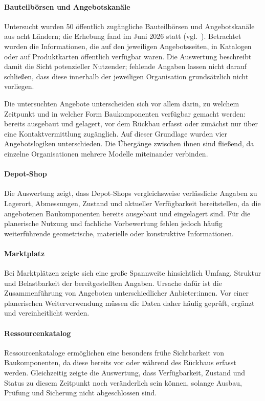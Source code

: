 \documentclass[type=zwischenbericht]{zukunftbau}
\begin{document}
\begin{SemioNest}
\paragraph{Bauteilbörsen und Angebotskanäle}
Untersucht wurden 50 öffentlich zugängliche Bauteilbörsen und Angebotskanäle aus acht Ländern; die Erhebung fand im Juni 2026 statt (vgl.\ ). Betrachtet wurden die Informationen, die auf den jeweiligen Angebotsseiten, in Katalogen oder auf Produktkarten öffentlich verfügbar waren. Die Auswertung beschreibt damit die Sicht potenzieller Nutzender; fehlende Angaben lassen nicht darauf schließen, dass diese innerhalb der jeweiligen Organisation grundsätzlich nicht vorliegen.

Die untersuchten Angebote unterscheiden sich vor allem darin, zu welchem Zeitpunkt und in welcher Form Baukomponenten verfügbar gemacht werden: bereits ausgebaut und gelagert, vor dem Rückbau erfasst oder zunächst nur über eine Kontaktvermittlung zugänglich. Auf dieser Grundlage wurden vier Angebotslogiken unterschieden. Die Übergänge zwischen ihnen sind fließend, da einzelne Organisationen mehrere Modelle miteinander verbinden.

\begin{SemioNest}
\paragraph{Depot-Shop}
Die Auswertung zeigt, dass Depot-Shops vergleichsweise verlässliche Angaben zu Lagerort, Abmessungen, Zustand und aktueller Verfügbarkeit bereitstellen, da die angebotenen Baukomponenten bereits ausgebaut und eingelagert sind. Für die planerische Nutzung und fachliche Vorbewertung fehlen jedoch häufig weiterführende geometrische, materielle oder konstruktive Informationen.

\paragraph{Marktplatz}
Bei Marktplätzen zeigte sich eine große Spannweite hinsichtlich Umfang, Struktur und Belastbarkeit der bereitgestellten Angaben. Ursache dafür ist die Zusammenführung von Angeboten unterschiedlicher Anbieter:innen. Vor einer planerischen Weiterverwendung müssen die Daten daher häufig geprüft, ergänzt und vereinheitlicht werden.

\paragraph{Ressourcenkatalog}
Ressourcenkataloge ermöglichen eine besonders frühe Sichtbarkeit von Baukomponenten, da diese bereits vor oder während des Rückbaus erfasst werden. Gleichzeitig zeigte die Auswertung, dass Verfügbarkeit, Zustand und Status zu diesem Zeitpunkt noch veränderlich sein können, solange Ausbau, Prüfung und Sicherung nicht abgeschlossen sind.


\end{SemioNest}
\end{SemioNest}
\end{document}
